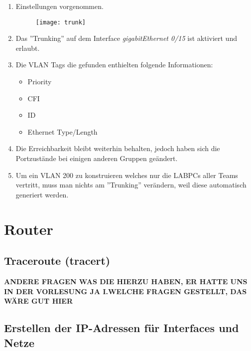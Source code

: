 \documentclass{scrartcl}
\begin{document}
  \renewcommand{\labelenumi}{\alph{enumi})}
  \begin{enumerate}
     \item
     Einstellungen vorgenommen.
     
     \begin{figure}
     \texttt{[image: trunk]}
     \label{fig:trunk}
     \end{figure}
     
     \item
     Das ''Trunking'' auf dem Interface \textit{gigabitEthernet 0/15} ist aktiviert und erlaubt.
     
     \item
     Die VLAN Tags die gefunden enthielten folgende Informationen:
     \begin{itemize}
     \item Priority
     \item CFI
     \item ID
     \item Ethernet Type/Length
     \end{itemize}
    
    \item
    Die Erreichbarkeit bleibt weiterhin behalten, jedoch haben sich die Portzustände bei einigen anderen Gruppen geändert.
    
    \item
    Um ein VLAN 200 zu konstruieren welches nur die LABPCs aller Teams vertritt, muss man nichts am ''Trunking'' verändern, weil diese automatisch generiert werden.
   \end{enumerate}
  
  \newpage
\section[Versuch 5 Router]{Router}
  
  \subsection[Aufgabe 2 Traceroute (tracert)]{Traceroute (tracert)}
  \textbf{ANDERE FRAGEN WAS DIE HIERZU HABEN, ER HATTE UNS IN DER VORLESUNG JA I.WELCHE FRAGEN GESTELLT, DAS WÄRE GUT HIER}
  
  \subsection[Aufgabe 4 Erstellen der IP-Adressen für Interfaces und Netze]{Erstellen der IP-Adressen für Interfaces und Netze}
  
\end{document}
